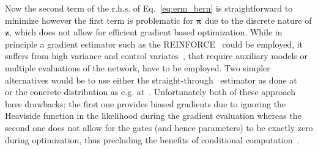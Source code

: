 \documentclass{article} %
\def\!#1{\boldsymbol{#1}}
\def\*#1{\mathbf{#1}}
\begin{document}
Now the second term of the r.h.s. of Eq.~\ref{eq:erm_bern} is straightforward to minimize however the first term is problematic for $\!\pi$ due to the discrete nature of $\*z$, which does not allow for efficient gradient based optimization. While in principle a gradient estimator such as the REINFORCE~\citep{williams1992simple} could be employed, it suffers from high variance and control variates~\citep{mnih2014neural,mnih2016variational,tucker2017rebar}, that require auxiliary models or multiple evaluations of the network, have to be employed. 
Two simpler alternatives would be to use either the straight-through~\citep{bengio2013estimating} estimator as done at ~\cite{srinivas2017training} or the concrete distribution as e.g. at~\cite{gal2017concrete}. Unfortunately both of these approach have drawbacks; the first one provides biased gradients due to ignoring the Heaviside function in the likelihood during the gradient evaluation whereas the second one does not allow for the gates (and hence parameters) to be exactly zero during optimization, thus precluding the benefits of conditional computation~\citep{bengio2013estimating}. 
\end{document}
